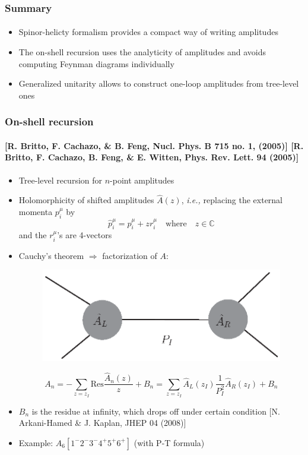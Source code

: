 \documentclass[english]{beamer}
\newcommand{\ie}{\textit{i.e., }}
\newcommand{\res}{\mathrm{Res}}
\begin{document}
\begin{frame}
\frametitle{Summary}
\framesubtitle{}
\begin{itemize}
\item<1-> Spinor-helicty formalism provides a compact way of writing amplitudes
\item<2-> The on-shell recursion uses the analyticity of amplitudes and avoids computing Feynman diagrams individually
\item<3-> Generalized unitarity allows to construct one-loop amplitudes from tree-level ones

\end{itemize}

\end{frame}

\appendix


\begin{frame}[shrink=10]
\frametitle{On-shell recursion}
\framesubtitle{
\tiny\color{blue}
[R. Britto, F. Cachazo, \& B. Feng, Nucl. Phys. B 715 no. 1, (2005)] 
[R. Britto, F. Cachazo, B. Feng, \& E. Witten, Phys. Rev. Lett. 94
(2005)]
}
\begin{itemize}


\item<1-> Tree-level recursion for $n$-point amplitudes
\item<2-> Holomorphicity of shifted amplitudes $\hat{A}(z)$, \ie replacing the external momenta $p^\mu_i$ by 
\begin{equation*}
\hat{p}^\mu_i = p^\mu_i + zr_i^\mu \quad\mathrm{where}\quad z\in\mathbb{C}
\end{equation*}
and the $r^\mu_i$'s are 4-vectors
\item<3-> Cauchy's theorem $\Rightarrow$ factorization of $A$: 
\begin{figure}[h]
  \centering
  \includegraphics[width=0.5\linewidth]{bcfw.eps}
\end{figure}
\begin{equation*}
A_n = - \sum_{z = z_I}\res\frac{\hat{A}_n(z)}{z} + B_n
=\sum_{z = z_I} \hat{A}_L(z_I)\frac{1}{P_I^2}\hat{A}_R(z_I) + B_n
\end{equation*} 
\item<4->[] $B_n$ is the residue at infinity, which drops off under certain condition 
\tiny\color{blue}[N. Arkani-Hamed \& J. Kaplan, JHEP 04 (2008)]
\color{black}\normalsize

\item<5-> Example: $A_6[1^-2^-3^-4^+5^+6^+]$ (with P-T formula)

\end{itemize}

\end{frame}
\end{document}
